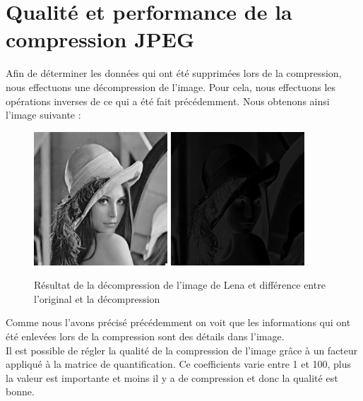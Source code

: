\documentclass[a4paper,11pt]{article}
\begin{document}
  \section{Qualité et performance de la compression JPEG}
  Afin de déterminer les données qui ont été supprimées lors de la compression, nous effectuons une décompression de l'image.
  Pour cela, nous effectuons les opérations inverses de ce qui a été fait précédemment. Nous obtenons ainsi l'image suivante :
  \begin{figure}[H]
    \center
   \includegraphics[width=5cm]{../result_lena.png}
   \includegraphics[width=5cm]{../diff_lena.png}
   \caption{Résultat de la décompression de l'image de Lena et différence entre l'original et la décompression}
  \end{figure}
  
  Comme nous l'avons précisé précédemment on voit que les informations qui ont été enlevées lors de la compression sont 
  des détails dans l'image.\\
  
  Il est possible de régler la qualité de la compression de l'image grâce à un facteur appliqué à la matrice de quantification.
  Ce coefficients varie entre 1 et 100, plus la valeur est importante et moins il y a de compression et donc la qualité est bonne.\\
  
\end{document}
